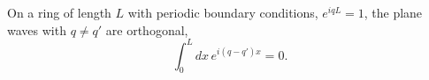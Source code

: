 \documentclass{article}
\begin{document}
On a ring of length $L$ with periodic boundary conditions, $e^{iqL}=1$, the plane waves
with $q \neq q'$ are orthogonal,
\begin{equation}
\int_0^{L} dx\, e^{i(q-q')x} = 0 .
\label{eq:orth}
\end{equation}
\end{document}

